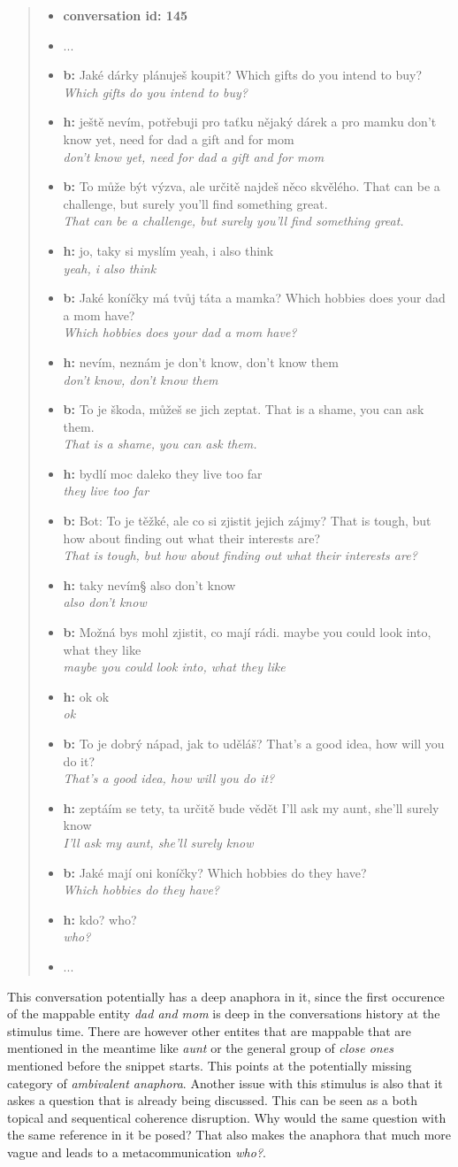 \documentclass[12pt]{report}
\newcommand{\utterance}[3]{%
    \textbf{#1} #2%
    \ifx\relax#3\relax%
    \else \\ \textit{#3}%
    \fi%
}
\begin{document}
{\begin{quote}
\begin{itemize}[label={}, leftmargin=0pt, itemsep=0.5em]
    \item \textbf{conversation id: 145}
    \item ...
    \item \utterance{b:}{Jaké dárky plánuješ koupit?}{Which gifts do you intend to buy?}
    \item \utterance{h:}{ještě nevím, potřebuji pro taťku nějaký dárek a pro mamku}{don't know yet, need for dad a gift and for mom}
    \item \utterance{b:}{To může být výzva, ale určitě najdeš něco skvělého.}{That can be a challenge, but surely you'll find something great.}
    \item \utterance{h:}{jo, taky si myslím}{yeah, i also think}
    \item \utterance{b:}{Jaké koníčky má tvůj táta a mamka?}{Which hobbies does your dad a mom have?}
    \item \utterance{h:}{nevím, neznám je}{don't know, don't know them}
    \item \utterance{b:}{To je škoda, můžeš se jich zeptat.}{That is a shame, you can ask them.}
    \item \utterance{h:}{bydlí moc daleko}{they live too far}
    \item \utterance{b:}{Bot: To je těžké, ale co si zjistit jejich zájmy?}{That is tough, but how about finding out what their interests are?}
    \item \utterance{h:}{taky nevím§}{also don't know}
    \item \utterance{b:}{Možná bys mohl zjistit, co mají rádi.}{maybe you could look into, what they like}
    \item \utterance{h:}{ok}{ok}
    \item \utterance{b:}{To je dobrý nápad, jak to uděláš?}{That's a good idea, how will you do it?}
    \item \utterance{h:}{zeptáím se tety, ta určitě bude vědět}{I'll ask my aunt, she'll surely know}
    \item \utterance{b:}{Jaké mají oni koníčky?}{Which hobbies do they have?}
    \item \utterance{h:}{kdo?}{who?}
    \item ...
\end{itemize}
\end{quote}

This conversation potentially has a deep anaphora in it,
since the first occurence of the mappable entity \textit{dad and mom} is deep in the conversations history
at the stimulus time.
There are however other entites that are mappable
that are mentioned in the meantime like \textit{aunt}
or the general group of \textit{close ones} mentioned before the snippet starts.
This points at the potentially missing category of \textit{ambivalent anaphora}.
Another issue with this stimulus is also that it askes a question that is already being discussed.
This can be seen as a both topical and sequentical coherence disruption.
Why would the same question with the same reference in it be posed?
That also makes the anaphora that much more vague and leads to a metacommunication \textit{who?}.

}
\end{document}

